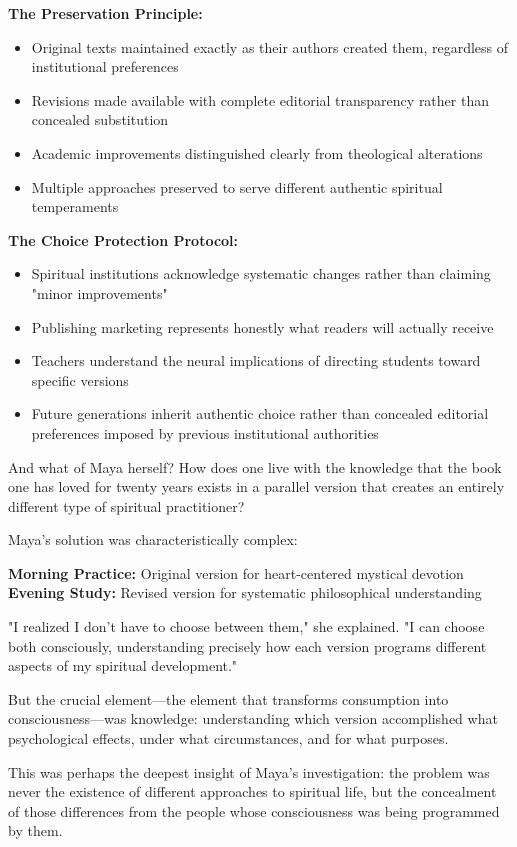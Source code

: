 \documentclass[12pt,twoside]{book}
\begin{document}
\textbf{\textbf{The Preservation Principle:}}
\begin{itemize}
\item Original texts maintained exactly as their authors created them, regardless of institutional preferences
\item Revisions made available with complete editorial transparency rather than concealed substitution
\item Academic improvements distinguished clearly from theological alterations
\item Multiple approaches preserved to serve different authentic spiritual temperaments
\end{itemize}

\textbf{\textbf{The Choice Protection Protocol:}}
\begin{itemize}
\item Spiritual institutions acknowledge systematic changes rather than claiming "minor improvements"
\item Publishing marketing represents honestly what readers will actually receive
\item Teachers understand the neural implications of directing students toward specific versions
\item Future generations inherit authentic choice rather than concealed editorial preferences imposed by previous institutional authorities
\end{itemize}

And what of Maya herself? How does one live with the knowledge that the book one has loved for twenty years exists in a parallel version that creates an entirely different type of spiritual practitioner?

Maya's solution was characteristically complex:

\textbf{\textbf{Morning Practice:}} Original version for heart-centered mystical devotion
\textbf{\textbf{Evening Study:}} Revised version for systematic philosophical understanding

"I realized I don't have to choose between them," she explained. "I can choose both consciously, understanding precisely how each version programs different aspects of my spiritual development."

But the crucial element—the element that transforms consumption into consciousness—was knowledge: understanding which version accomplished what psychological effects, under what circumstances, and for what purposes.

This was perhaps the deepest insight of Maya's investigation: the problem was never the existence of different approaches to spiritual life, but the concealment of those differences from the people whose consciousness was being programmed by them.
\end{document}
